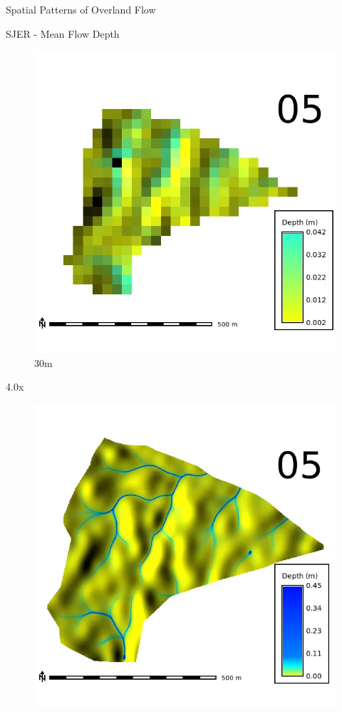 \documentclass[
  ignorenonframetext,
]{beamer}
\begin{document}
\begin{frame}{Spatial Patterns of Overland Flow}
\begin{block}{SJER - Mean Flow Depth}
\begin{figure}[H]
{\centering \includegraphics{../output/SJER/sensitivity_1/SJER_depth_30_1_s_average.webp}

}

\caption{30m}

\end{figure}%

4.0x

\begin{figure}[H]

{\centering \includegraphics{../output/SJER/sensitivity_1/SJER_depth_1_4_s_average.webp}

}
\end{figure}
\end{block}
\end{frame}
\end{document}
